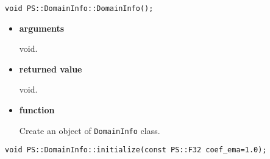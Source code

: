 
\begin{screen}
\begin{verbatim}
void PS::DomainInfo::DomainInfo();
\end{verbatim}
\end{screen}

\begin{itemize}

\item {\bf arguments}

void.

\item {\bf returned value}

void.

\item {\bf function}

Create an object of {\tt DomainInfo} class.

\end{itemize}


\begin{screen}
\begin{verbatim}
void PS::DomainInfo::initialize(const PS::F32 coef_ema=1.0);
\end{verbatim}
\end{screen}

